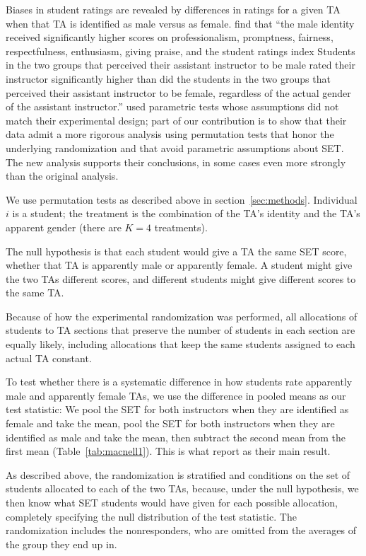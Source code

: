 \documentclass[12pt]{article}
\begin{document}
Biases in student ratings are revealed by differences in ratings for a given TA when that 
TA is identified as male versus as female.
\citet{MacNell2014} find that ``the male identity received significantly higher scores on professionalism, promptness, fairness, respectfulness, enthusiasm, giving praise, and the
student ratings index \textellipsis Students in the two groups that perceived their assistant
instructor to be male rated their instructor significantly higher than did the students in the
two groups that perceived their assistant instructor to be female, regardless of the actual gender
of the assistant instructor.'' 
\citet{MacNell2014} used parametric tests whose assumptions did not match their experimental
design; part of our contribution is to show that their data admit a more rigorous analysis
using permutation tests that honor the underlying randomization and that avoid parametric
assumptions about SET. 
The new analysis supports their conclusions, in some cases even more strongly than the original
analysis.

We use permutation tests as described above in section~\ref{sec:methods}.
Individual $i$ is a student; the treatment is the combination of the TA's identity and the TA's
apparent gender (there are $K=4$ treatments).

The null hypothesis is that each student would give a TA the same SET score,
whether that TA is apparently male or apparently female.
A student might give the two TAs different scores,
and different students might give different scores to the same TA. 

Because of how the experimental randomization was performed, all allocations of students to 
TA sections that preserve the number of students in each section are equally likely,  
including allocations that keep the same students assigned to each actual TA constant.

To test whether there is a systematic difference in how students rate apparently male and 
apparently female TAs, we use the difference in pooled means as our test statistic:
We pool the SET for both instructors when they are identified as female
and take the mean, pool the SET for both instructors when they are identified as male
and take the mean, then subtract the second mean from the first mean
(Table~\ref{tab:macnell1}).
This is what \cite{MacNell2014} report as their main result.

As described above, the randomization is stratified and conditions on the set of students 
allocated to each of the two TAs, because, under the null hypothesis, we then know what 
SET students would have given for each possible allocation, completely specifying the
null distribution of the test statistic.
The randomization includes the nonresponders, who are omitted from the averages of the
group they end up in.
\end{document}
